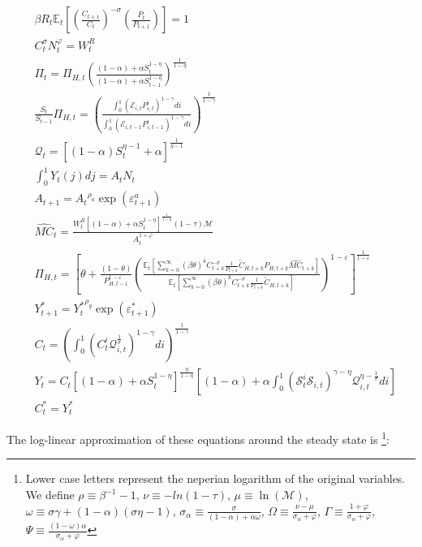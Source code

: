 \documentclass{article}
\newcommand{\Et}{\mathbb{E}_t}
\newcommand{\E}{\mathcal{E}}
\begin{document}
\begin{subequations}
    \label{se}
    \begin{align}
        &\beta R_t \Et\left[\left(\frac{C_{t+1}}{C_t} \right)^{-\sigma} \left(\frac{P_t}{P_{t+1}} \right) \right] = 1\\
        & C_t^\sigma N_t^\varphi = W_t^R\\
        &\Pi_t = \Pi_{H,t} \left(\frac{(1-\alpha) + \alpha S_t^{1-\eta}} {(1-\alpha) + \alpha S_{t-1}^{1-\eta}} \right)^{\frac{1}{1-\eta}}\\
        &\frac{S_t}{S_{t-1}}\Pi_{H,t} = \left(\frac{\int^1_0 \left(\E_{i,t} P^i_{i,t} \right)^{1-\gamma} di }{\int^1_0 \left(\E_{i,t-1} P^i_{i,t-1} \right)^{1-\gamma} di} \right)^{\frac{1}{1-\gamma}}\\
        &\mathcal{Q}_{t}  = \left[(1-\alpha)S_t^{\eta-1} + \alpha \right]^{\frac{1}{\eta-1}}\\
        &\int^1_0 Y_t(j) dj = A_t N_t\\
        &A_{t+1} = {A_t}^{\rho_a}\exp( \varepsilon^a_{t+1})\\
        &\widehat{MC}_t  = \frac{W_t^R \left[(1-\alpha) + \alpha S_t^{1-\eta} \right]^{\frac{1}{1-\eta}} (1 - \tau) \mathcal M}{A_t^{1+\varphi}}\\
        &\Pi_{H,t} = \left[ \theta + \frac{(1-\theta)}{P_{H,t-1}^{1-\varepsilon}} \left(\frac{\Et\left[ \sum^\infty_{k=0} (\beta\theta)^k C_{t+k}^{-\sigma} \frac{1}{P_{t+k}}\tilde C_{H,t+k} P_{H,t+k} \widehat{MC}_{t+k}\right] }{\Et\left[ \sum^\infty_{k=0} (\beta\theta)^k C_{t+k}^{-\sigma} \frac{1}{P_{t+k}} \tilde C_{H,t+k}  \right]} \right)^{1-\varepsilon}\right]^\frac{1}{1-\varepsilon}\\
        &Y^*_{t+1} = {Y^*_t}^{\rho_y}\exp( \varepsilon^*_{t+1})\\
        &C_t = \left(\int^1_0  \left(C_t^i \mathcal Q_{i,t}^{\frac{1}{\sigma}}\right)^{1-\gamma} di \right)^{\frac{1}{1-\gamma}}\\
        &Y_{t} = C_t \left[(1-\alpha) + \alpha S_t^{1-\eta} \right]^{\frac{\eta}{1-\eta}} \left[(1-\alpha)  +  \alpha \int_0^1 \left(\mathcal S^i_t \mathcal S_{i,t} \right)^{\gamma - \eta} \mathcal Q^{\eta - \frac{1}{\sigma}}_{i,t} di \right] \\
        & C_t^* = Y_t^*
    \end{align}
\end{subequations}

The log-linear approximation of these equations around the steady state is \footnote{Lower case letters represent the neperian logarithm of the original variables. We define $\rho \equiv \beta^{-1} -1$,  $\nu \equiv -ln(1-\tau)$, $\mu \equiv \ln(\mathcal M)$, $\omega \equiv \sigma \gamma + (1-\alpha)(\sigma \eta - 1)$, $\sigma_\alpha \equiv \frac{\sigma}{(1-\alpha) + \alpha \omega}$, $\Omega \equiv \frac{\nu - \mu}{\sigma_\alpha + \varphi}$, $\Gamma \equiv \frac{1 + \varphi}{\sigma_\alpha + \varphi}$, $\Psi \equiv \frac{(1-\omega) \alpha}{\sigma_\alpha + \varphi}$}:
\end{document}
